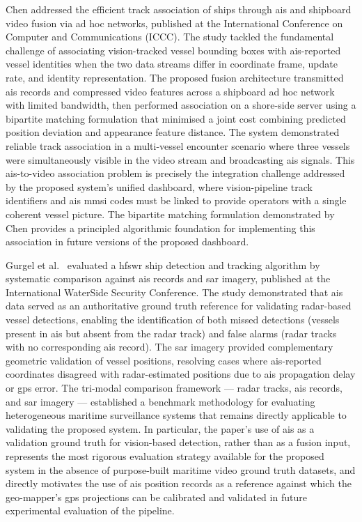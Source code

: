 Chen \cite{Chen2023a} addressed the efficient track association of ships through \gls{ais} and shipboard video fusion via ad hoc networks, published at the International Conference on Computer and Communications (ICCC). The study tackled the fundamental challenge of associating vision-tracked vessel bounding boxes with \gls{ais}-reported vessel identities when the two data streams differ in coordinate frame, update rate, and identity representation. The proposed fusion architecture transmitted \gls{ais} records and compressed video features across a shipboard ad hoc network with limited bandwidth, then performed association on a shore-side server using a bipartite matching formulation that minimised a joint cost combining predicted position deviation and appearance feature distance. The system demonstrated reliable track association in a multi-vessel encounter scenario where three vessels were simultaneously visible in the video stream and broadcasting \gls{ais} signals. This \gls{ais}-to-video association problem is precisely the integration challenge addressed by the proposed system's unified dashboard, where vision-pipeline track identifiers
and \gls{ais} \gls{mmsi} codes must be linked to provide operators with a single coherent vessel picture. The bipartite matching formulation
demonstrated by Chen provides a principled algorithmic foundation for implementing this association in future versions of the proposed dashboard.

Gurgel et al.\ \cite{Gurgel2010} evaluated a \gls{hfswr} ship detection and tracking algorithm by systematic comparison against \gls{ais} records and \gls{sar} imagery, published at the International WaterSide Security Conference. The study demonstrated that \gls{ais} data served as an authoritative ground truth reference for validating radar-based vessel detections, enabling the identification of both missed detections (vessels present in \gls{ais} but absent from the radar track) and false alarms (radar tracks with no corresponding \gls{ais} record). The \gls{sar} imagery provided complementary geometric validation of vessel positions, resolving cases where \gls{ais}-reported coordinates disagreed with radar-estimated positions due to \gls{ais} propagation delay or \gls{gps} error. The tri-modal comparison framework --- radar tracks, \gls{ais} records, and \gls{sar} imagery --- established a benchmark methodology for evaluating heterogeneous maritime surveillance systems that remains directly applicable to validating the proposed system. In particular, the paper's use of \gls{ais} as a validation ground truth for vision-based detection, rather than as a fusion input, represents the most rigorous evaluation strategy available for the proposed system in the absence of purpose-built maritime video ground truth datasets, and directly motivates the use of \gls{ais} position records as a reference against which the geo-mapper's \gls{gps} projections can be calibrated and validated in future experimental evaluation of the pipeline. 

